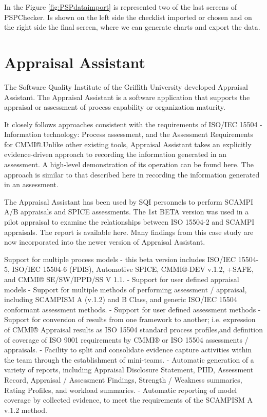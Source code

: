 In the Figure \ref{fig:PSPdataimport} is represented two of the last screens of PSPChecker. Is shown on the left side the checklist imported or chosen and on the right side the final screen, where we can generate charts and export the data.

\section{Appraisal Assistant}

The Software Quality Institute of the Griffith University developed Appraisal Assistant. The Appraisal Assistant is a software application that supports the appraisal or assessment of process capability or organization maturity.



It closely follows approaches consistent with the requirements of ISO/IEC 15504 - Information technology: Process assessment, and the Assessment Requirements for CMMI®.Unlike other existing tools, Appraisal Assistant takes an explicitly evidence-driven approach to recording the information generated in an assessment. A high-level demonstration of its operation can be found here. The approach is similar to that described here in recording the information generated in an assessment.

The Appraisal Assistant has been used by SQI personnels to perform SCAMPI A/B appraisals and SPICE assessments. The 1st BETA version was used in a pilot appraisal to examine the relationships between ISO 15504-2 and SCAMPI appraisals. The report is available here. Many findings from this case study are now incorporated into the newer version of Appraisal Assistant.


Support for multiple process models - this beta version includes ISO/IEC 15504-5, ISO/IEC 15504-6 (FDIS), Automotive SPICE, CMMI®-DEV v.1.2, +SAFE, and CMMI® SE/SW/IPPD/SS V 1.1.
- Support for user defined appraisal models
- Support for multiple methods of performing assessment / appraisal, including SCAMPISM A (v.1.2) and B Class, and generic ISO/IEC 15504 conformant assessment methods.
- Support for user defined assessment methods
- Support for conversion of results from one framework to another; i.e. expression of CMMI® Appraisal results as ISO 15504 standard process profiles,and definition of coverage of ISO 9001 requirements by CMMI® or ISO 15504 assessments / appraisals.
- Facility to split and consolidate evidence capture activities within the team through the establishment of mini-teams.
- Automatic generation of a variety of reports, including Appraisal Disclosure Statement, PIID, Assessment Record, Appraisal / Assessment Findings, Strength / Weakness summaries, Rating Profiles, and workload summaries.
- Automatic reporting of model coverage by collected evidence, to meet the requirements of the SCAMPISM A v.1.2 method.
